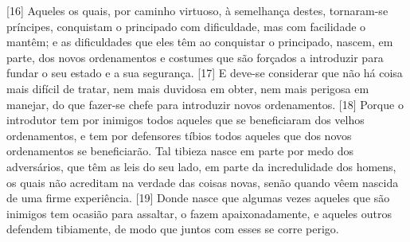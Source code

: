 {[}16{]} Aqueles os quais, por caminho virtuoso, à semelhança destes,
tornaram-se príncipes, conquistam o principado com dificuldade, mas com
facilidade o mantêm; e as dificuldades que eles têm ao conquistar o
principado, nascem, em parte, dos novos ordenamentos e costumes que são
forçados a introduzir para fundar o seu estado e a sua segurança.
{[}17{]} E deve-se considerar que não há coisa mais difícil de tratar,
nem mais duvidosa em obter, nem mais perigosa em manejar, do que
fazer-se chefe para introduzir novos ordenamentos. {[}18{]} Porque o
introdutor tem por inimigos todos aqueles que se beneficiaram dos velhos
ordenamentos, e tem por defensores tíbios todos aqueles que dos novos
ordenamentos se beneficiarão. Tal tibieza nasce em parte por medo dos
adversários, que têm as leis do seu lado, em parte da incredulidade dos
homens, os quais não acreditam na verdade das coisas novas, senão quando
vêem nascida de uma firme experiência. {[}19{]} Donde nasce que algumas
vezes aqueles que são inimigos tem ocasião para assaltar, o fazem
apaixonadamente, e aqueles outros defendem tibiamente, de modo que
juntos com esses se corre perigo.

